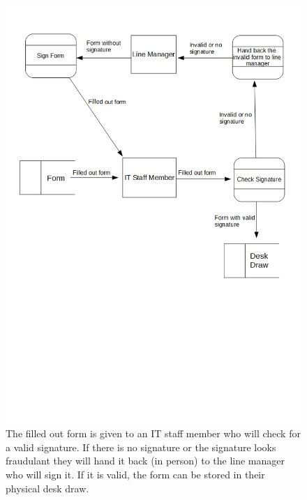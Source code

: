 \begin{figure}[H]
\includegraphics[width=\textwidth]{dataflowdiagram2.jpg}
\caption{The filled out form is given to an IT staff member who will check for a valid signature. If there is no signature or the signature looks fraudulant they will hand it back (in person) to the line manager who will sign it. If it is valid, the form can be stored in their physical desk draw.} \label{Page1Interview}
\end{figure}

